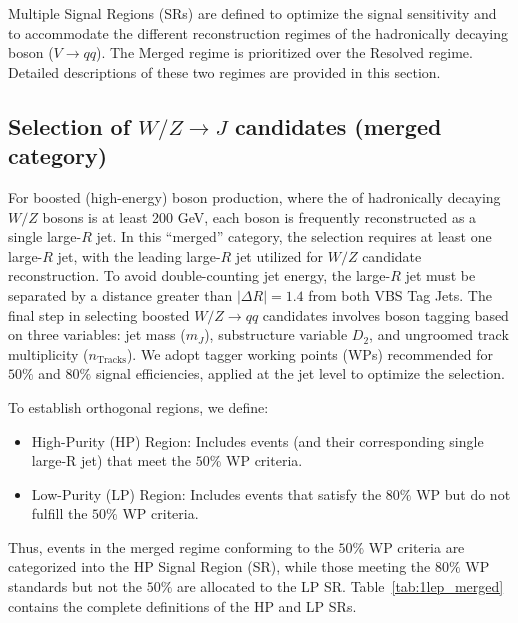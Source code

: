 \label{subsec:sr_selection}

Multiple Signal Regions (SRs) are defined to optimize the signal sensitivity and to accommodate the different reconstruction regimes of the hadronically decaying boson ($V \rightarrow qq$). The Merged regime is prioritized over the Resolved regime. Detailed descriptions of these two regimes are provided in this section.

\subsection{Selection of \texorpdfstring{$W/Z \to J$}{W/Z -> J} candidates (merged category)}
\label{subsubsec:merged_jets_selection}

For boosted (high-energy) boson production, where the \pt of hadronically decaying $W/Z$ bosons is at least 200 GeV, each boson is frequently reconstructed as a single large-$R$ jet. In this ``merged'' category, the selection requires at least one large-$R$ jet, with the leading large-$R$ jet utilized for $W/Z$ candidate reconstruction. To avoid double-counting jet energy, the large-$R$ jet must be separated by a distance greater than $|\Delta R| = 1.4$ from both VBS Tag Jets.
%
The final step in selecting boosted $W/Z \to qq$ candidates involves boson tagging based on three variables: jet mass ($m_{J}$), substructure variable $D_2$, and ungroomed track multiplicity ($n_{\text{Tracks}}$).
We adopt tagger working points (WPs) recommended for $50\%$ and $80\%$ signal efficiencies, applied at the jet level to optimize the selection.

To establish orthogonal regions, we define:
\begin{itemize}
    \item High-Purity (HP) Region: Includes events (and their corresponding single large-R jet) that meet the $50\%$ WP criteria.
    \item Low-Purity (LP) Region: Includes events that satisfy the $80\%$ WP but do not fulfill the $50\%$ WP criteria.
\end{itemize}
Thus, events in the merged regime conforming to the $50\%$ WP criteria are categorized into the HP Signal Region (SR), while those meeting the $80\%$ WP standards but not the $50\%$ are allocated to the LP SR. Table~\ref{tab:1lep_merged} contains the complete definitions of the HP and LP SRs.

